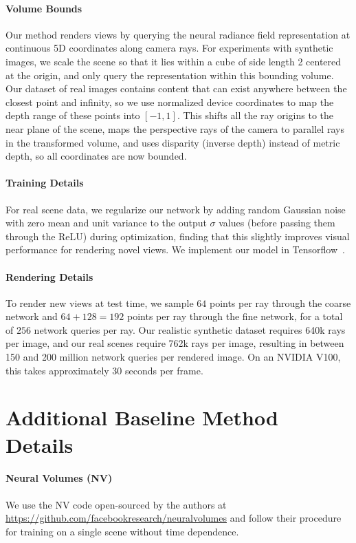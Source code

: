 \documentclass[runningheads]{llncs}
\begin{document}
\paragraph{\textbf{Volume Bounds}}
Our method renders views by querying the neural radiance field representation at continuous 5D coordinates along camera rays. For experiments with synthetic images, we scale the scene so that it lies within a cube of side length 2 centered at the origin, and only query the representation within this bounding volume. Our dataset of real images contains content that can exist anywhere between the closest point and infinity, so we use normalized device coordinates to map the depth range of these points into $[-1,1]$. This shifts all the ray origins to the near plane of the scene, maps the perspective rays of the camera to parallel rays in the transformed volume, and uses disparity (inverse depth) instead of metric depth, so all coordinates are now bounded.

\paragraph{\textbf{Training Details}}
For real scene data, we regularize our network by adding random Gaussian noise with zero mean and unit variance to the output $\sigma$ values (before passing them through the ReLU) during optimization, finding that this slightly improves visual performance for rendering novel views. We implement our model in Tensorflow~\cite{tensorflow}.

\paragraph{\textbf{Rendering Details}}
To render new views at test time, we sample $64$ points per ray through the coarse network and $64+128=192$ points per ray through the fine network, for a total of $256$ network queries per ray. Our realistic synthetic dataset requires 640k rays per image, and our real scenes require 762k rays per image, resulting in between 150 and 200 million network queries per rendered image. On an NVIDIA V100, this takes approximately 30 seconds per frame.

\section{Additional Baseline Method Details}

\paragraph{\textbf{Neural Volumes (NV)}~\cite{neuralvolumes}}
We use the NV code open-sourced by the authors at \url{https://github.com/facebookresearch/neuralvolumes} and follow their procedure for training on a single scene without time dependence. 
\end{document}
